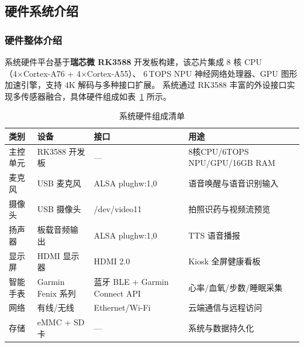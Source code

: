 \documentclass[12pt, a4paper]{ctexart}
\begin{document}
\subsection{硬件系统介绍}

\subsubsection{硬件整体介绍}

系统硬件平台基于\textbf{瑞芯微 RK3588} 开发板构建，该芯片集成 8 核 CPU（4×Cortex-A76 + 4×Cortex-A55）、
6\,TOPS NPU 神经网络处理器、GPU 图形加速引擎，支持 4K 解码与多种接口扩展。
系统通过 RK3588 丰富的外设接口实现多传感器融合，具体硬件组成如表~\ref{tab:hardware} 所示。

\begin{table}[H]
\centering
\caption{系统硬件组成清单}
\label{tab:hardware}
\begin{tabularx}{\textwidth}{l l l X}
\toprule
\textbf{类别} & \textbf{设备} & \textbf{接口} & \textbf{用途} \\
\midrule
主控单元 & RK3588 开发板 & — & 8核CPU/6TOPS NPU/GPU/16GB RAM \\
麦克风 & USB 麦克风 & ALSA plughw:1,0 & 语音唤醒与语音识别输入 \\
摄像头 & USB 摄像头 & /dev/video11 & 拍照识药与视频流预览 \\
扬声器 & 板载音频输出 & ALSA plughw:1,0 & TTS 语音播报 \\
显示屏 & HDMI 显示器 & HDMI 2.0 & Kiosk 全屏健康看板 \\
智能手表 & Garmin Fenix 系列 & 蓝牙 BLE + Garmin Connect API & 心率/血氧/步数/睡眠采集 \\
网络 & 有线/无线 & Ethernet/Wi-Fi & 云端通信与远程访问 \\
存储 & eMMC + SD 卡 & — & 系统与数据持久化 \\
\bottomrule
\end{tabularx}
\end{table}
\end{document}
